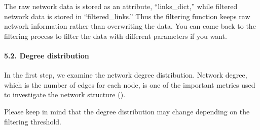 \documentclass[letterpaper,10pt,english]{sphinxmanual}
\begin{document}
The raw network data is stored as an attribute, “links\_dict,” while filtered network data is stored in “filtered\_links.” Thus the filtering function keeps raw network information rather than overwriting the data. You can come back to the filtering process to filter the data with different parameters if you want.

{
\begin{sphinxVerbatim}[commandchars=\\\{\}]
\llap{\color{nbsphinxin}[26]:\,\hspace{\fboxrule}\hspace{\fboxsep}}  
\end{sphinxVerbatim}
}


\paragraph{5.2. Degree distribution}
\label{\detokenize{notebooks/04_Network_analysis/Network_analysis_with_with_Paul_etal_2015_data:5.2.-Degree-distribution}}
In the first step, we examine the network degree distribution. Network degree, which is the number of edges for each node, is one of the important metrics used to investigate the network structure ().

Please keep in mind that the degree distribution may change depending on the filtering threshold.

{
\begin{sphinxVerbatim}[commandchars=\\\{\}]
\llap{\color{nbsphinxin}[27]:\,\hspace{\fboxrule}\hspace{\fboxsep}}\PYG{p}{[}\PYG{p}{]}  \PYG{p}{[} \PYG{p}{]}
\end{sphinxVerbatim}
}
\end{document}
